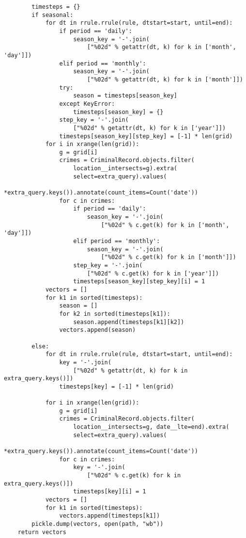 \begin{small}
\begin{verbatim}
        timesteps = {}
        if seasonal:
            for dt in rrule.rrule(rule, dtstart=start, until=end):
                if period == 'daily':
                    season_key = '-'.join(
                        ["%02d" % getattr(dt, k) for k in ['month', 'day']])
                elif period == 'monthly':
                    season_key = '-'.join(
                        ["%02d" % getattr(dt, k) for k in ['month']])
                try:
                    season = timesteps[season_key]
                except KeyError:
                    timesteps[season_key] = {}
                step_key = '-'.join(
                    ["%02d" % getattr(dt, k) for k in ['year']])
                timesteps[season_key][step_key] = [-1] * len(grid)
            for i in xrange(len(grid)):
                g = grid[i]
                crimes = CriminalRecord.objects.filter(
                    location__intersects=g).extra(
                    select=extra_query).values(
                    *extra_query.keys()).annotate(count_items=Count('date'))
                for c in crimes:
                    if period == 'daily':
                        season_key = '-'.join(
                            ["%02d" % c.get(k) for k in ['month', 'day']])
                    elif period == 'monthly':
                        season_key = '-'.join(
                            ["%02d" % c.get(k) for k in ['month']])
                    step_key = '-'.join(
                        ["%02d" % c.get(k) for k in ['year']])
                    timesteps[season_key][step_key][i] = 1
            vectors = []
            for k1 in sorted(timesteps):
                season = []
                for k2 in sorted(timesteps[k1]):
                    season.append(timesteps[k1][k2])
                vectors.append(season)

        else:
            for dt in rrule.rrule(rule, dtstart=start, until=end):
                key = '-'.join(
                    ["%02d" % getattr(dt, k) for k in extra_query.keys()])
                timesteps[key] = [-1] * len(grid)

            for i in xrange(len(grid)):
                g = grid[i]
                crimes = CriminalRecord.objects.filter(
                    location__intersects=g, date__lte=end).extra(
                    select=extra_query).values(
                    *extra_query.keys()).annotate(count_items=Count('date'))
                for c in crimes:
                    key = '-'.join(
                        ["%02d" % c.get(k) for k in extra_query.keys()])
                    timesteps[key][i] = 1
            vectors = []
            for k1 in sorted(timesteps):
                vectors.append(timesteps[k1])
        pickle.dump(vectors, open(path, "wb"))
    return vectors



\end{verbatim}
\end{small}
